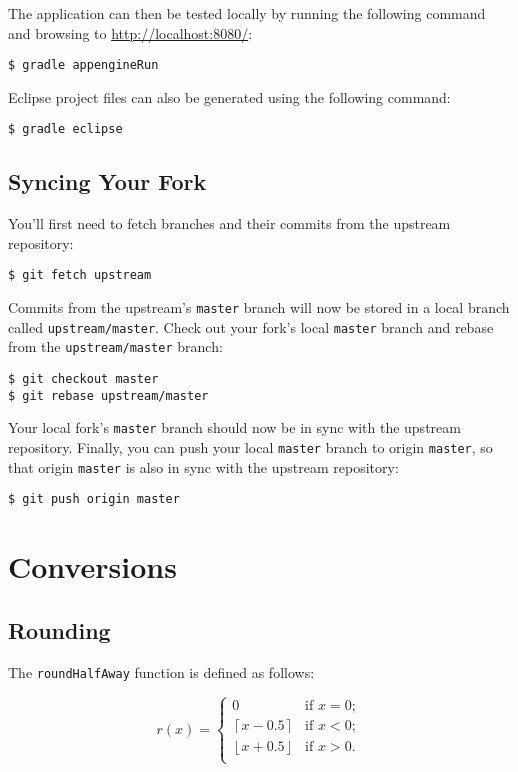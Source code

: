 \documentclass[11pt,a4paper]{article}
\newcommand{\ceil}[1]{\left\lceil #1 \right\rceil}
\newcommand{\floor}[1]{\left\lfloor #1 \right\rfloor}
\begin{document}
\begin{appendices}
The application can then be tested locally by running the following command and browsing to
\url{http://localhost:8080/}:

\lstset{language=sh}
\begin{lstlisting}
$ gradle appengineRun
\end{lstlisting}

Eclipse\cite{eclipse} project files can also be generated using the following command:

\lstset{language=sh}
\begin{lstlisting}
$ gradle eclipse
\end{lstlisting}

\subsection{Syncing Your Fork}

You'll first need to fetch branches and their commits from the upstream repository:

\lstset{language=sh}
\begin{lstlisting}
$ git fetch upstream
\end{lstlisting}

Commits from the upstream's \texttt{master} branch will now be stored in a local branch called
\texttt{upstream/master}. Check out your fork's local \texttt{master} branch and rebase from the
\texttt{upstream/master} branch:

\lstset{language=sh}
\begin{lstlisting}
$ git checkout master
$ git rebase upstream/master
\end{lstlisting}

Your local fork's \texttt{master} branch should now be in sync with the upstream
repository. Finally, you can push your local \texttt{master} branch to origin \texttt{master}, so
that origin \texttt{master} is also in sync with the upstream repository:

\lstset{language=sh}
\begin{lstlisting}
$ git push origin master
\end{lstlisting}

\section{Conversions}

\subsection{Rounding}

The \texttt{roundHalfAway} function is defined as follows:

\[r(x) = \left\{\begin{array}{ll}
  0 & \mbox{if $x = 0$};\\
  \ceil{x-0.5} & \mbox{if $x < 0$};\\
  \floor{x+0.5} & \mbox{if $x > 0$}.\\
\end{array}\right.
\]

\end{appendices}

\newpage
{}


\printglossaries
\end{document}
